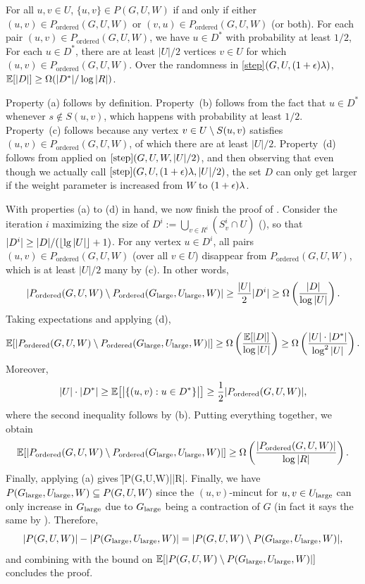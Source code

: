 \BE
\im[(a)] For all $u,v\in U$, $\{u,v\}\in P(G,U,W)$ if and only if either $(u,v)\in P_{\text{ordered}}(G,U,W)$ or $(v,u)\in P_{\text{ordered}}(G,U,W)$ (or both).
\im[(b)] For each pair $(u,v)\in P_{\text{ordered}}(G,U,W)$, we have $u\in D^*$ with probability at least $1/2$,
\im[(c)] For each $u\in D^*$, there are at least $|U|/2$ vertices $v\in U$ for which $(u,v)\in P_{\text{ordered}}(G,U,W)$.
\im[(d)] Over the randomness in \ref{step}$(G,U,(1+\epsilon)\lambda)$, $\mathbb E[|D|]\ge\Omega(|D^*|/\log|R|)$.
\EE

Property (a) follows by definition.
Property~(b) follows from the fact that $u\in D^*$ whenever $s\notin S(u,v)$, which happens with probability at least $1/2$. 
Property~(c) follows because any vertex $v\in U\setminus S(u,v)$ satisfies $(u,v)\in P_{\text{ordered}}(G,U,W)$, of which there are at least $|U|/2$. Property~(d) follows from  applied on  $\ref{step}(G,U,W,|U|/2)$, and then observing that even though we actually call $\ref{step}(G,U,(1+\epsilon)\lambda,|U|/2)$, the set $D$ can only get larger if the weight parameter is increased from $W$ to $(1+\epsilon)\lambda$.

With properties (a) to (d) in hand, we now finish the proof of . Consider the iteration $i$ maximizing the size of $D^i := \bigcup_{v\in R^i} (S^i_v\cap U)$ (), so that $|D^i|\ge|D|/(\lfloor\lg|U|\rfloor+1)$. For any vertex $u\in D^i$, all pairs $(u,v)\in P_{\text{ordered}}(G,U,W)$ (over all $v\in U$) disappear from $P_{\text{ordered}}(G,U,W)$, which is at least $|U|/2$ many by (c). In other words, 
\[ |P_{\text{ordered}}(G,U,W)\setminus P_{\text{ordered}}(G_{\textup{large}},U_{\textup{large}},W)| \ge \frac{|U|}2|D^i| \ge\Omega\left(\frac{|D|}{\log|U|}\right)   .\]
Taking expectations and applying (d), 
\[ \mathbb E[|P_{\text{ordered}}(G,U,W)\setminus P_{\text{ordered}}(G_{\textup{large}},U_{\textup{large}},W)|] \ge\Omega\left(\frac{\mathbb E[|D|]}{\log|U|}\right)    \ge \Omega\left(\frac{|U|\cdot|D^*|}{\log^2|U|}\right)  .\]
Moreover,
\[ |U|\cdot|D^*| \ge \mathbb E\big[\big| \{(u,v): u\in D^*\} \big|\big] \ge \frac12|P_{\text{ordered}}(G,U,W)|,  \]
where the second inequality follows by (b). Putting everything together, we obtain
\[ \mathbb E[|P_{\text{ordered}}(G,U,W)\setminus P_{\text{ordered}}(G_{\textup{large}},U_{\textup{large}},W)|] \ge \Omega\left(\frac{|P_{\text{ordered}}(G,U,W)|}{\log|R|}\right)   .\]
Finally, applying (a) gives
\BG {} \ge \Om\lp\f{|P(G,U,W)|}{\log|R|}\rp .\nonumber%
\EG
Finally, we have $P(G_{\textup{large}},U_{\textup{large}},W) \subseteq P(G,U,W)$ since the $(u,v)$-mincut for $u,v\in U_{\textup{large}}$ can only increase in $G_{\textup{large}}$ due to $G_{\textup{large}}$ being a contraction of $G$ (in fact it says the same by ). Therefore,
\[ |P(G,U,W)| - |P(G_{\textup{large}},U_{\textup{large}},W)| = |P(G,U,W) \setminus P(G_{\textup{large}},U_{\textup{large}},W)| ,\]
and combining with the bound on $\mathbb E[|P(G,U,W) \setminus P(G_{\textup{large}},U_{\textup{large}},W)|]$ concludes the proof.
\EP

